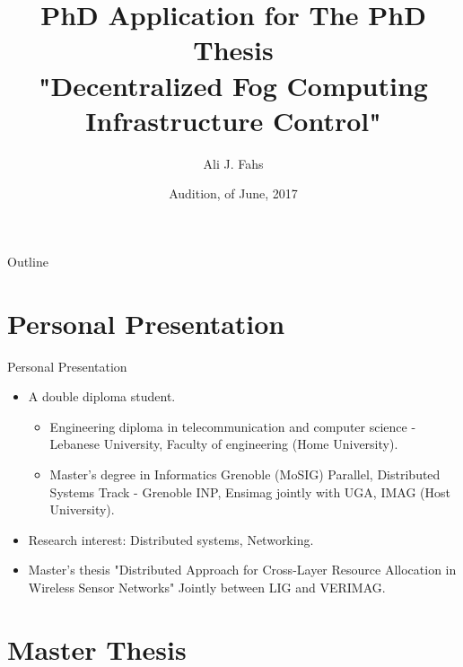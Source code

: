 \documentclass{beamer}
\title{PhD Application for The PhD Thesis\\ "Decentralized Fog Computing Infrastructure Control"}
\subtitle{}
\author{Ali J. Fahs}%
\institute[Institut de Recherche en Informatique et Systèmes Aléatoires (IRISA)] %
{
  
  Institut de Recherche en Informatique et Systèmes Aléatoires (IRISA)\\MYRIADS Team\\Supervised by Professor Guillaume Pierre 
  
  
  }
\date{Audition, \nth{8} of June, 2017}
\begin{document}
\begin{frame}
  \titlepage
\end{frame}

\begin{frame}{Outline}
  \tableofcontents
 
\end{frame}

\section{Personal Presentation}
\begin{frame}{Personal Presentation}
\begin{itemize}
\item A double diploma student.
\begin{itemize}
\item Engineering diploma in telecommunication and computer science - Lebanese University, Faculty of engineering (Home University).
\item Master's degree in Informatics Grenoble (MoSIG) Parallel, Distributed Systems Track - Grenoble INP, Ensimag jointly with UGA, IMAG (Host University).
\end{itemize}

\item Research interest: Distributed systems, Networking.
\item Master's thesis "Distributed Approach for Cross-Layer Resource Allocation in Wireless Sensor Networks" Jointly between LIG and VERIMAG.
\end{itemize}

 
\end{frame}


\section{Master Thesis}
\end{document}
